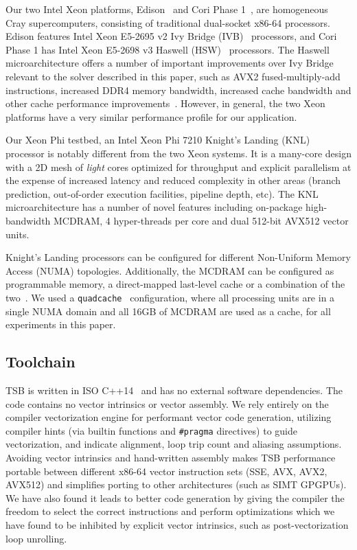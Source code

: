 \documentclass{sig-alternate-05-2015}
\begin{document}
Our two Intel Xeon platforms, Edison~\cite{edison_configuration} and Cori Phase
  1~\cite{cori_phase_1_configuration}, are homogeneous Cray supercomputers,
  consisting of traditional dual-socket x86-64 processors.
Edison features Intel Xeon E5-2695 v2 Ivy Bridge (IVB)~\cite{intel_ark_xeon_e5_2695_v2}
  processors, and Cori Phase 1 has Intel Xeon E5-2698
  v3 Haswell (HSW)~\cite{intel_ark_xeon_e5_2698_v3} processors.
The Haswell microarchitecture offers a number of important improvements over
  Ivy Bridge relevant to the solver described in this paper, such as AVX2
  fused-multiply-add instructions, increased DDR4 memory bandwidth, increased
  cache bandwidth and other cache performance improvements~\cite{intel_opt_manual}.
However, in general, the two Xeon platforms have a very similar performance
  profile for our application.

Our Xeon Phi testbed, an Intel Xeon Phi 7210 Knight's Landing (KNL)~\cite{intel_ark_xeon_phi_7210}
  processor is notably different from the two Xeon systems.
It is a many-core design with a 2D mesh of \emph{light} cores optimized
  for throughput and explicit parallelism at the expense of increased latency
  and reduced complexity in other areas (branch prediction, out-of-order
  execution facilities, pipeline depth, etc).
The KNL microarchitecture has a number of novel features including on-package
  high-bandwidth MCDRAM, 4 hyper-threads per core and dual 512-bit
  AVX512 vector units.~\cite{roofline_knl,sodani_slides}

Knight's Landing processors can be configured for different Non-Uniform Memory
  Access (NUMA) topologies.
Additionally, the MCDRAM can be configured as programmable memory, a
  direct-mapped last-level cache or a combination of the
  two~\cite{sodani_slides}.
We used a \lstinline{quadcache}~\cite{roofline_knl} configuration, where all
  processing units are in a single NUMA domain and all 16GB of MCDRAM are used
  as a cache, for all experiments in this paper.

\subsection{Toolchain}
\label{sec:experimental_setup:toolchain}

TSB is written in ISO C++14~\cite{cxx14} and has no external software
  dependencies.
The code contains no vector intrinsics or vector assembly.
We rely entirely on the compiler vectorization engine for performant vector
  code generation, utilizing compiler hints (via builtin functions and
  \lstinline{#pragma} directives) to guide vectorization, and indicate alignment,
  loop trip count and aliasing assumptions.
Avoiding vector intrinsics and hand-written assembly makes TSB performance
  portable between different x86-64 vector instruction sets (SSE, AVX, AVX2,
  AVX512) and simplifies porting to other architectures (such as SIMT GPGPUs).
We have also found it leads to better code generation by giving the compiler
  the freedom to select the correct instructions and perform optimizations which
  we have found to be inhibited by explicit vector intrinsics, such as
  post-vectorization loop unrolling.
\end{document}
